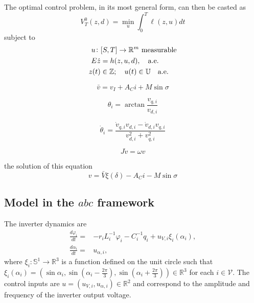 \documentclass[journal, final, letterpaper]{IEEEtran}
\newcommand{\ts}[1]{{\textnormal{#1}}}
\newcommand{\diff}[2]{{\frac{d #1}{d #2}}}
\newcommand{\Rset}{\mathbb{R}}
\newcommand{\mc}{\mathcal}
\newcommand{\mbb}{\mathbb}
\begin{document}
The optimal control problem, in its most general form, can then be casted as
%
\begin{equation}
	V^0_T(z,d) = \min\limits_{u}\int_0^T\ell(z,u)dt 	
\label{eq:ocp_cost}
\end{equation}
%
subject to 
%
\begin{subequations}
\begin{align}
	u\colon &[S,T]\to\Rset^m\ts{ measurable}\\
	E\dot{z}& = h(z,u,d),\quad \ts{a.e.}\\
	z(t) &\in\mbb{Z}; \quad u(t)\in\mbb{U}\quad \ts{a.e.}
\end{align}
\label{eq:ocp_constraints}
\end{subequations}
%


\[\bar{v} = v_I + A_C i +M\sin\sigma \]

\[\theta_i = \arctan\frac{v_{q,i}}{v_{d,i}} \]

\[\dot{\theta}_i =\frac{\dot{v}_{q,i}v_{d,i} - \dot{v}_{d,i}v_{q,i}}{v_{d,i}^2+v_{q,i}^2}\]

\[
J\dot{v} = \omega v
\]


the solution of this equation 
\[v = \bar{V}\xi(\delta) - A_Ci - M\sin\sigma\]



\subsection{Model in the $abc$ framework}
\label{sec:model_abc}
%


The inverter dynamics are
%
\begin{subequations}
\begin{align}
\diff{\varphi_i}{t} =& -r_i L_i^{-1}\varphi_i - C_i^{-1}q_i + u_{V,i}\xi_i(\alpha_i),\label{eq:dyn_line_ii}\\
\diff{\alpha_i}{t} =& u_{\alpha,i},\label{eq:dyn_line_ai}
\end{align}
\label{eq:dyn_inv_c_abc}	
\end{subequations}
%
where $\xi_i\colon\mbb{S}^1\to\Rset^3$ is a function defined on the unit circle such that $\xi_i(\alpha_i) = (\sin{\alpha_i},\sin{(\alpha_i - \frac{2\pi}{3})},\sin{(\alpha_i + \frac{2\pi}{3})})\in\Rset^3$ for each $i\in\mc{V}$. The control inputs are $u = (u_{V,i},u_{\alpha,i})\in \Rset^2$ and correspond to the amplitude and frequency of the inverter output voltage. 
\end{document}
